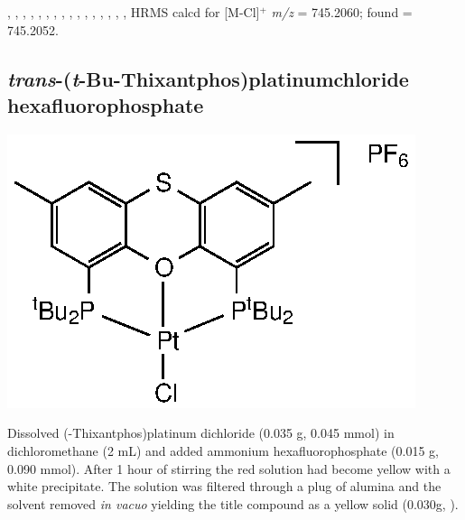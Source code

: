 ,
,
,
,
,
,
,
,
,
,
,
,
,
,
,
,
HRMS calcd for  [M-Cl]$^+$ \emph{m/z} = 745.2060; found = 745.2052.


\subsection*{\emph{trans}-(\emph{t}-Bu-Thixantphos)platinumchloride hexafluorophosphate}
\begin{structure}[h]
\begin{center}
\includegraphics{../Structures/StBuPtClPF6.eps}
\end{center}
\end{structure}

Dissolved (\tBu-Thixantphos)platinum dichloride (0.035 g, 0.045 mmol) in dichloromethane (2 mL) and added ammonium hexafluorophosphate (0.015 g, 0.090 mmol).  After 1 hour of stirring the red solution had become yellow with a white precipitate.  The solution was filtered through a plug of alumina and the solvent removed \emph{in vacuo} yielding the title compound as a yellow solid (0.030g, \fixme{\%}).  

